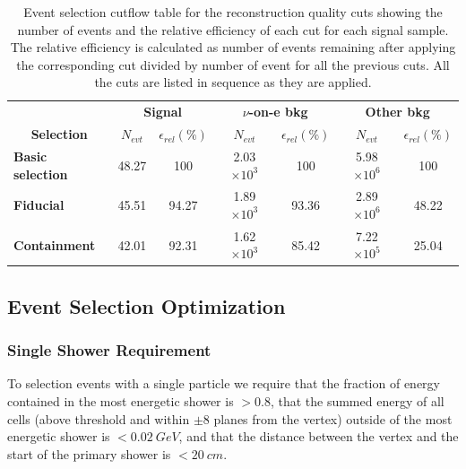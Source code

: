 \begin{table}[!hb]
\centering
\caption[Event selection cutflow table for the reconstruction quality cut]{Event selection cutflow table for the reconstruction quality cuts showing the number of events and the relative efficiency of each cut for each signal sample. The relative efficiency is calculated as number of events remaining after applying the corresponding cut divided by number of event for all the previous cuts. All the cuts are listed in sequence as they are applied.}
\begin{tabular}{|l|cc|cc|cc|}\hline
\multicolumn{1}{|c|}{} & \multicolumn{2}{c|}{\textbf{Signal}} & \multicolumn{2}{c|}{\textbf{$\nu$-on-e bkg}} & \multicolumn{2}{c|}{\textbf{Other bkg}} \\
\multicolumn{1}{|c|}{\multirow{-2}{*}{\textbf{Selection}}} & \textbf{$N_{evt}$} & \textbf{$\epsilon_{rel}\left(\%\right)$} & \textbf{$N_{evt}$} & \textbf{$\epsilon_{rel}\left(\%\right)$}  & \textbf{$N_{evt}$} & \textbf{$\epsilon_{rel}\left(\%\right)$}\\\hline
\textbf{Basic selection} & 48.27 & 100 & 2.03$\times 10^3$ & 100 & 5.98$\times 10^6$ & 100\\
\textbf{Fiducial} & 45.51 & 94.27 & 1.89$\times 10^3$ & 93.36 & 2.89$\times 10^6$ & 48.22\\
\textbf{Containment} & 42.01 & 92.31 & 1.62$\times 10^3$ & 85.42 & 7.22$\times 10^5$ & 25.04\\\hline
\end{tabular}
\label{tab:CutflowTableFiducialContainmnet}
\end{table}

\subsection{Event Selection Optimization}

\subsubsection*{Single Shower Requirement}

To selection events with a single particle we require that the fraction of energy contained in the most energetic shower is $>0.8$, that the summed energy of all cells (above threshold and within $\pm8$ planes from the vertex) outside of the most energetic shower is $<0.02\ \unit{GeV}$, and that the distance between the vertex and the start of the primary shower is $<20\ \unit{cm}$.

